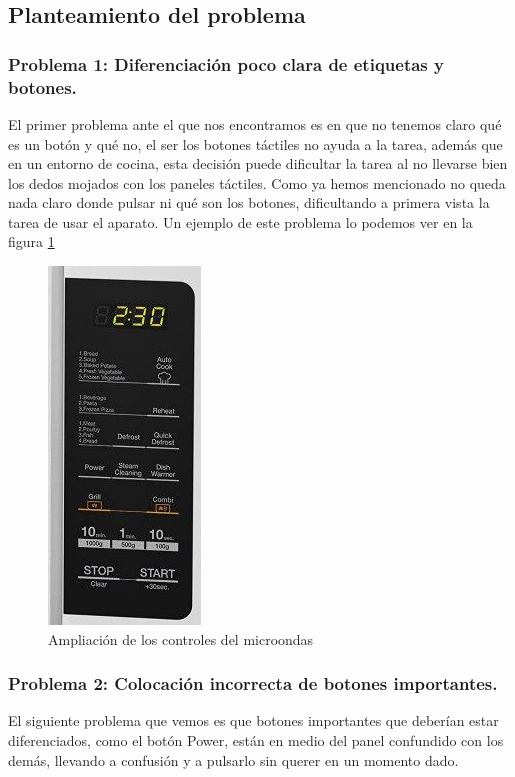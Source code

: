 \documentclass[a4paper,11pt]{article}
\begin{document}
\subsection{Planteamiento del problema}
\subsubsection{Problema 1: Diferenciación poco clara de etiquetas y botones.}

El primer problema ante el que nos encontramos es en que no tenemos claro qué es un botón y qué no, el ser los botones táctiles no ayuda a la tarea, además que en un entorno de cocina, esta decisión puede dificultar la tarea al no llevarse bien los dedos mojados con los paneles táctiles. Como ya hemos mencionado no queda nada claro donde pulsar ni qué son los botones, dificultando a primera vista la tarea de usar el aparato. Un ejemplo de este problema lo podemos ver en la figura \ref{fig:miccontrol}

\begin{figure}[h!]
 \centering
 \includegraphics[scale=1]{microondasampliado.png}
 \caption{Ampliación de los controles del microondas}
 \label{fig:miccontrol}
\end{figure}

\subsubsection{Problema 2: Colocación incorrecta de botones importantes.}
El siguiente problema que vemos es que botones importantes que deberían estar diferenciados, como el botón Power, están en medio del panel confundido con los demás, llevando a confusión y a pulsarlo sin querer en un momento dado.
\end{document}
